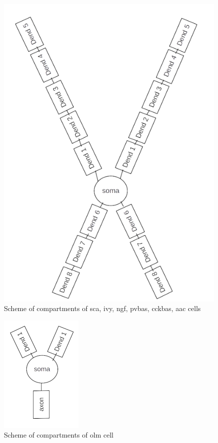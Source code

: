 \documentclass[a4paper,12pt]{article}
\begin{document}
\begin{figure}[h]
	 \centering
\includegraphics{interneuron_structures.png}
	\caption{Scheme of compartments of sca, ivy, ngf, pvbas, cckbas, aac cells}
	\label{fig:interneuron_structures}
\end{figure}


\begin{figure}[h]
	\centering
\includegraphics{olm_structure.png}
\caption{Scheme of compartments of olm cell}
\label{fig:olm_structures}
\end{figure}
\end{document}
